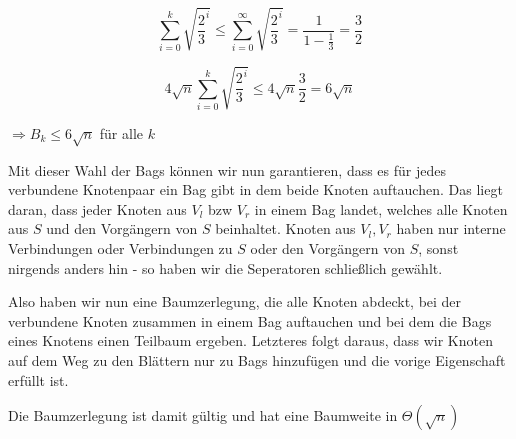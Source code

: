 $$ \sum\limits_{i=0}^k \sqrt{\frac{2}{3}^i} \leq \sum\limits_{i=0}^{\infty} \sqrt{\frac{2}{3}^i} = \frac{1}{1 - \frac{1}{3}} = \frac{3}{2}$$

$$ 4\sqrt{n}\sum\limits_{i=0}^k \sqrt{\frac{2}{3}^i} \leq 4\sqrt{n} \frac{3}{2} = 6\sqrt{n}$$

$\Rightarrow B_k \leq 6\sqrt{n}$ für alle $k$

Mit dieser Wahl der Bags können wir nun garantieren, dass es für jedes verbundene Knotenpaar ein Bag gibt in dem beide Knoten auftauchen.
Das liegt daran, dass jeder Knoten aus $V_l$ bzw $V_r$ in einem Bag landet, welches alle Knoten aus $S$ und den Vorgängern von $S$ beinhaltet. Knoten aus $V_l, V_r$ haben nur interne Verbindungen oder Verbindungen zu $S$ oder den Vorgängern von $S$, sonst nirgends anders hin - so haben wir die Seperatoren schließlich gewählt.

Also haben wir nun eine Baumzerlegung, die alle Knoten abdeckt, bei der verbundene Knoten zusammen in einem Bag auftauchen und bei dem die Bags eines Knotens einen Teilbaum ergeben. Letzteres folgt daraus, dass wir Knoten auf dem Weg zu den Blättern nur zu Bags hinzufügen und die vorige Eigenschaft erfüllt ist.

Die Baumzerlegung ist damit gültig und hat eine Baumweite in $\Theta(\sqrt{n})$
